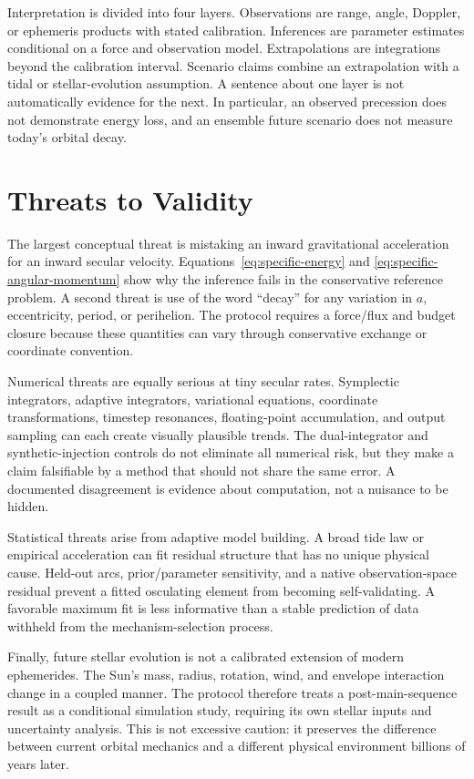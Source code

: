 \documentclass[10pt,conference]{IEEEtran}
\begin{document}
Interpretation is divided into four layers. Observations are range, angle, Doppler, or ephemeris products with stated calibration. Inferences are parameter estimates conditional on a force and observation model. Extrapolations are integrations beyond the calibration interval. Scenario claims combine an extrapolation with a tidal or stellar-evolution assumption. A sentence about one layer is not automatically evidence for the next. In particular, an observed precession does not demonstrate energy loss, and an ensemble future scenario does not measure today's orbital decay.

\section{Threats to Validity}
\label{sec:validity}

The largest conceptual threat is mistaking an inward gravitational acceleration for an inward secular velocity. Equations~\eqref{eq:specific-energy} and \eqref{eq:specific-angular-momentum} show why the inference fails in the conservative reference problem. A second threat is use of the word ``decay'' for any variation in $a$, eccentricity, period, or perihelion. The protocol requires a force/flux and budget closure because these quantities can vary through conservative exchange or coordinate convention.

Numerical threats are equally serious at tiny secular rates. Symplectic integrators, adaptive integrators, variational equations, coordinate transformations, timestep resonances, floating-point accumulation, and output sampling can each create visually plausible trends. The dual-integrator and synthetic-injection controls do not eliminate all numerical risk, but they make a claim falsifiable by a method that should not share the same error. A documented disagreement is evidence about computation, not a nuisance to be hidden.

Statistical threats arise from adaptive model building. A broad tide law or empirical acceleration can fit residual structure that has no unique physical cause. Held-out arcs, prior/parameter sensitivity, and a native observation-space residual prevent a fitted osculating element from becoming self-validating. A favorable maximum fit is less informative than a stable prediction of data withheld from the mechanism-selection process.

Finally, future stellar evolution is not a calibrated extension of modern ephemerides. The Sun's mass, radius, rotation, wind, and envelope interaction change in a coupled manner. The protocol therefore treats a post-main-sequence result as a conditional simulation study, requiring its own stellar inputs and uncertainty analysis. This is not excessive caution: it preserves the difference between current orbital mechanics and a different physical environment billions of years later.
\end{document}
